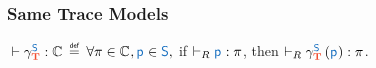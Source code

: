 \documentclass[a4paper,12pt]{article}
\begin{document}
\subsubsection{Same Trace Models}

\begin{definition}{}
  \begin{center}
    $\rtp{\ccST}{\varClass}$
    $\isdef$
    $\forall \varProperty\in\varClass, \srcComponent\in\src{S},$ %
    if $\rsat{\srcComponent}{\varProperty}$,
    then $\rsat{\ccST\lrpars{\srcComponent}}{\varProperty}$.
  \end{center}
\end{definition}





\printglossary
\end{document}
